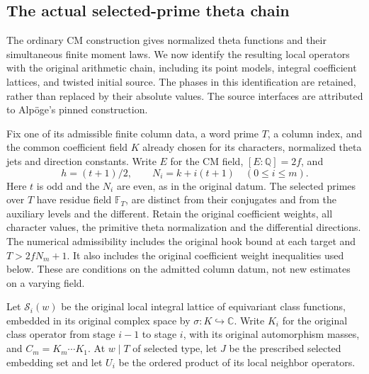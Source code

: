 \subsection{The actual selected-prime theta chain}
\label{sec:actual-theta-chain}

The ordinary CM construction gives normalized theta functions and their
simultaneous finite moment laws.  We now identify the resulting local
operators with the original arithmetic chain, including its point
models, integral coefficient lattices, and twisted initial source.
The phases in this identification are retained, rather than replaced by
their absolute values.  The source interfaces are attributed to
Alp\"oge's pinned construction.\cite{theta-chain-source}

Fix one of its admissible finite column data, a word prime $T$, a column
index, and the common coefficient field $K$ already chosen for its
characters, normalized theta jets and direction constants.  Write
$E$ for the CM field, $[E:\mathbb Q]=2f$, and
\[
 h=(t+1)/2,\qquad N_i=k+i(t+1)\quad(0\le i\le m).
\]
Here $t$ is odd and the $N_i$ are even, as in the original datum.
The selected primes over $T$ have residue field $\mathbb F_T$, are
distinct from their conjugates and from the auxiliary levels and the
different.  Retain the original coefficient weights, all character
values, the primitive theta normalization and the differential
directions.  The numerical admissibility includes the original hook
bound at each target and $T>2fN_m+1$.  It also includes the original
coefficient weight inequalities used below.  These are conditions on
the admitted column datum, not new estimates on a varying field.

Let $\mathscr S_i(w)$ be the original local integral lattice of
equivariant class functions, embedded in its original complex space by
$\sigma:K\hookrightarrow\mathbb C$.  Write $K_i$ for the original
class operator from stage $i-1$ to stage $i$, with its original
automorphism masses, and $C_m=K_m\cdots K_1$.  At $w\mid T$ of
selected type, let $J$ be the prescribed selected embedding set and
let $U_i$ be the ordered product of its local neighbor operators.

